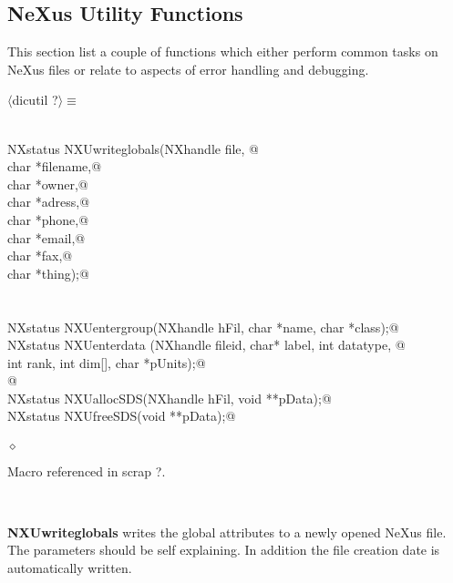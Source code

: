 \documentclass[12pt]{article}
\begin{document}
  
  \subsection{NeXus Utility Functions}
  This section list a couple of functions which either perform common 
   tasks on NeXus files or relate
  to aspects of error handling and debugging.

\begin{flushleft} \small
\begin{minipage}{\linewidth} \label{scrap4}
$\langle$dicutil {\footnotesize ?}$\rangle\equiv$
\vspace{-1ex}
\begin{list}{}{} \item
\mbox{}\verb@@\\
\mbox{}\verb@        NXstatus NXUwriteglobals(NXhandle file, @\\
\mbox{}\verb@                            char *filename,@\\
\mbox{}\verb@                            char *owner,@\\
\mbox{}\verb@                            char *adress,@\\
\mbox{}\verb@                            char *phone,@\\
\mbox{}\verb@                            char *email,@\\
\mbox{}\verb@                            char *fax,@\\
\mbox{}\verb@                            char *thing);@\\
\mbox{}\verb@@\\
\mbox{}\verb@@\\
\mbox{}\verb@   NXstatus NXUentergroup(NXhandle hFil, char *name, char *class);@\\
\mbox{}\verb@   NXstatus NXUenterdata (NXhandle fileid, char* label, int datatype, @\\
\mbox{}\verb@                          int rank, int dim[], char *pUnits);@\\
\mbox{}\verb@   @\\
\mbox{}\verb@   NXstatus NXUallocSDS(NXhandle hFil, void **pData);@\\
\mbox{}\verb@   NXstatus NXUfreeSDS(void **pData);@\\
\mbox{}\verb@@\\
\mbox{}\verb@@$\diamond$
\end{list}
\vspace{-1ex}
\footnotesize\addtolength{\baselineskip}{-1ex}
\begin{list}{}{\setlength{\itemsep}{-\parsep}\setlength{\itemindent}{-\leftmargin}}
\item Macro referenced in scrap ?.
\end{list}
\end{minipage}\\[4ex]
\end{flushleft}
{\bf NXUwriteglobals} writes the global attributes to a newly opened 
 NeXus file. The parameters should be self explaining. In addition 
 the file creation date is automatically written.
\end{document}
